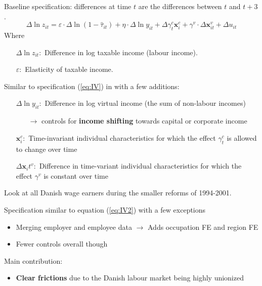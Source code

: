 \documentclass[8pt]{beamer}
\begin{document}
\begin{frame}{\citet{kleven2014estimating}}
  Baseline specification: differences at time $t$ are the differences between $t$ and $t+3$.
  \begin{equation}
    \Delta\ln z_{it} = \varepsilon\cdot\Delta\ln(1-\hat{\tau}_{it}) + \eta\cdot\Delta\ln y_{it} + \Delta\gamma_t^c \bm{x}_i^c + \gamma^v\cdot\Delta\bm{x}_{it}^v + \Delta u_{it}
    \label{eq:IV2}
  \end{equation}
  Where
  \begin{itemize}
    \item[$\Delta \ln z_{it}:$] Difference in log taxable income (labour income).
    \item[$\varepsilon:$] Elasticity of taxable income.
  \end{itemize}
  Similar to specification (\ref{eq:IV}) in \citep{gruber2002elasticity} with a few additions:
  \begin{itemize}
    \item[$\Delta \ln y_{it}:$] Difference in log virtual income (the sum of non-labour incomes)
    \begin{itemize}
      \item[$\rightarrow$] controls for \textbf{income shifting} towards capital or corporate income
    \end{itemize}
    \item[$\bm{x}_i^c:$] Time-invariant individual characteristics for which the effect $\gamma_t^c$ is allowed to change over time
    \item[$\Delta \bm{x}_it^v:$] Difference in time-variant individual characteristics for which the effect $\gamma^v$ is constant over time
  \end{itemize}
\end{frame}


\begin{frame}{\citet{chetty2011adjustment}}
  Look at all Danish wage earners during the smaller reforms of 1994-2001.

  Specification similar to equation (\ref{eq:IV2}) \citep{kleven2014estimating} with a few exceptions
  \begin{itemize}
    \item Merging employer and employee data $\rightarrow$ Adds occupation FE and region FE
    \item Fewer controls overall though
  \end{itemize}
  Main contribution:
  \begin{itemize}
    \item \textbf{Clear frictions} due to the Danish labour market being highly unionized
  \end{itemize}
\end{frame}
\end{document}
